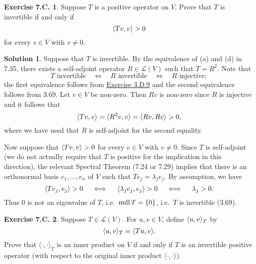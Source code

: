 \documentclass[12pt]{article}
\theoremstyle{definition}
\theoremstyle{exercise}
\newtheorem{exercise}{Exercise 7.C.}
\theoremstyle{solution}
\newtheorem*{solution}{Solution}
\newcommand{\lmap}{\mathcal{L}}
\newcommand{\Null}{\text{null\,}}
\newcommand{\quiff}{\quad \iff \quad}
\newcommand{\ipanon}{\langle \cdot, \cdot \rangle}
\DeclarePairedDelimiter\ip{\langle}{\rangle}
\begin{document}
\begin{exercise}
\label{ex:7}
    Suppose \( T \) is a positive operator on \( V \). Prove that \( T \) is invertible if and only if
    \[
        \ip{Tv, v} > 0
    \]
    for every \( v \in V \) with \( v \neq 0 \).
\end{exercise}

\begin{solution}
    Suppose that \( T \) is invertible. By the equivalence of (a) and (d) in 7.35, there exists a self-adjoint operator \( R \in \lmap(V) \) such that \( T = R^2 \). Note that
    \[
        T \text{ invertible} \quiff R \text{ invertible} \quiff R \text{ injective};
    \]
    the first equivalence follows from \href{https://lew98.github.io/Mathematics/LADR_Section_3_D_Exercises.pdf}{Exercise 3.D.9} and the second equivalence follows from 3.69. Let \( v \in V \) be non-zero. Then \( Rv \) is non-zero since \( R \) is injective and it follows that
    \[
        \ip{Tv, v} = \ip{R^2 v, v} = \ip{Rv, Rv} > 0,
    \]
    where we have used that \( R \) is self-adjoint for the second equality.

    Now suppose that \( \ip{Tv, v} > 0 \) for every \( v \in V \) with \( v \neq 0 \). Since \( T \) is self-adjoint (we do not actually require that \( T \) is positive for the implication in this direction), the relevant Spectral Theorem (7.24 or 7.29) implies that there is an orthonormal basis \( e_1, \ldots, e_n \) of \( V \) such that \( T e_j = \lambda_j e_j \). By assumption, we have
    \[
        \ip{T e_j, e_j} > 0 \quiff \ip{\lambda_j e_j, e_j} > 0 \quiff \lambda_j > 0.
    \]
    Thus 0 is not an eigenvalue of \( T \), i.e.\ \( \Null T = \{ 0 \} \), i.e.\ \( T \) is invertible (3.69).
\end{solution}

\begin{exercise}
\label{ex:8}
    Suppose \( T \in \lmap(V) \). For \( u, v \in V \), define \( \ip{u, v}_T \) by
    \[
        \ip{u, v}_T = \ip{Tu, v}.
    \]
    Prove that \( \ipanon_T \) is an inner product on \( V \) if and only if \( T \) is an invertible positive operator (with respect to the original inner product \( \ipanon \)).
\end{exercise}
\end{document}
